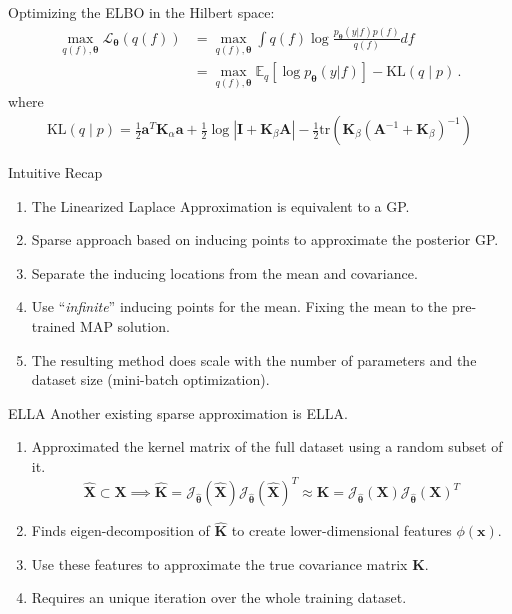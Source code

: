 \documentclass[aspectratio=149]{beamer}
\begin{document}
    \begin{frame}
        Optimizing the ELBO in the Hilbert space:
        \[
        \begin{aligned}
        \max_{q(f), \bm{\theta}} \mathcal{L}_{\bm{\theta}} (q(f)) &= \max_{q(f), \bm{\theta}} \int q(f) \log \frac{p_{\bm{\theta}}(y|f)p(f)}{q(f)} df \\
        &= \max_{q(f), \bm{\theta}}\mathbb{E}_q \left[ \log p_{\bm{\theta}}(y|f)\right] - \text{KL}\left(q \mid p\right)\,.
        \end{aligned}
        \]
        where
        \[
            \begin{aligned}
                \text{KL}\left(q \mid p\right) = \frac{1}{2} \bm{a}^T \bm{K}_{\alpha} \bm{a} + \frac{1}{2} \log |\bm{I} + \bm{K}_{\beta} \bm{A}| - \frac{1}{2} \text{tr}\left( \bm{K}_\beta(\bm{A}^{-1} + \bm{K}_\beta)^{-1} \right)
            \end{aligned}
        \]
    \end{frame}

    \begin{frame}{Intuitive Recap}
        \begin{enumerate}[<+->]
            \item The Linearized Laplace Approximation is equivalent to a GP.
            \item Sparse approach based on inducing points to approximate the posterior GP.
            \item Separate the inducing locations from the mean and covariance.
            \item Use ``\emph{infinite}'' inducing points for the mean. Fixing the mean to the pre-trained MAP solution.
            \item The resulting method does scale with the number of parameters and the dataset size (mini-batch optimization).
        \end{enumerate}
    \end{frame}

    \begin{frame}{ELLA}
        Another existing sparse approximation is ELLA. 

        \begin{enumerate}
            \item Approximated the kernel matrix of the full dataset using a random subset of it.
            \[  
                \hat{\mathbf X} \subset \mathbf X \implies \hat{\bm{K}} = \mathcal{J}_{\hat{\bm{\theta}}}(\hat{\mathbf{X}}) \mathcal{J}_{\hat{\bm{\theta}}}(\hat{\mathbf{X}}) ^T \approx \bm{K} = \mathcal{J}_{\hat{\bm{\theta}}}(\mathbf{X}) \mathcal{J}_{\hat{\bm{\theta}}}(\mathbf{X}) ^T 
            \]
            \item Finds eigen-decomposition of \(\hat{\bm{K}}\) to create lower-dimensional features \(\phi(\mathbf x)\).
            \item Use these features to approximate the true covariance matrix \(\bm{K}\).
            \item Requires an unique iteration over the whole training dataset.
        \end{enumerate}
    \end{frame}
\end{document}
